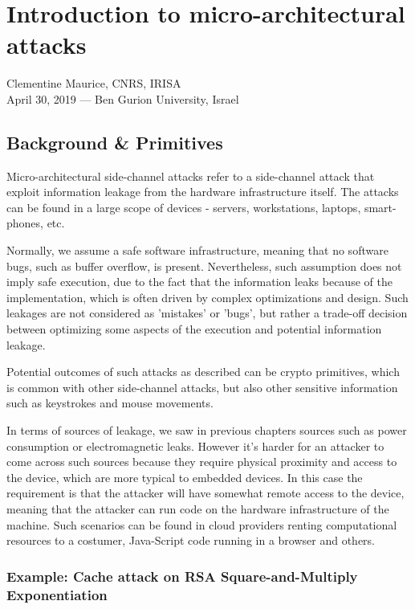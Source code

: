 \chapter{Introduction to micro-architectural attacks}
\label{chap:c7_cacheattacks}

Clementine Maurice, CNRS, IRISA\\
April 30, 2019 — Ben Gurion University, Israel

\section{Background \& Primitives} %
\label{sec:BackgroundnPrimitives}

Micro-architectural side-channel attacks refer to a side-channel attack that
exploit information leakage from the hardware infrastructure itself. The attacks
can be found in a large scope of devices - servers, workstations, laptops,
smart-phones, etc.

Normally, we assume a safe software infrastructure, meaning that no software
bugs, such as buffer overflow, is present. Nevertheless, such assumption does
not imply safe execution, due to the fact that the information leaks because of
the implementation, which is often driven by complex optimizations and design.
Such leakages are not considered as 'mistakes' or 'bugs', but rather a trade-off
decision between optimizing some aspects of the execution and potential
information leakage.    

Potential outcomes of such attacks as described can be crypto primitives, which
is common with other side-channel attacks, but also other sensitive information
such as keystrokes and mouse movements.  

In terms of sources of leakage, we saw in previous chapters sources such as
power consumption or electromagnetic leaks. However it's harder for an attacker to come across such sources because they require physical proximity and access to
the device, which are more typical to embedded devices. In this case the
requirement is that the attacker will have somewhat remote access to the device, meaning
that the attacker can run code on the hardware infrastructure of the machine.
Such scenarios can be found in cloud providers renting computational resources
to a costumer, Java-Script code running in a browser and others.

\subsection{Example: Cache attack on RSA Square-and-Multiply Exponentiation}
\label{subsec:CacheattackonRSA}

